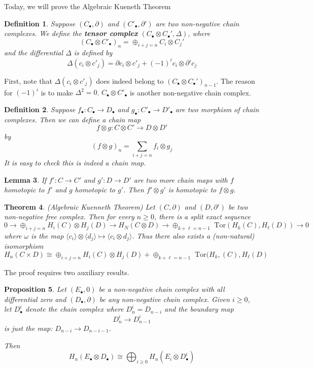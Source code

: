 \documentclass[11pt]{article}
\newtheorem{thm}{Theorem}[section]
\newtheorem{prop}[thm]{Proposition}
\newtheorem{lemma}[thm]{Lemma}
\newtheorem{dfn}[thm]{Definition}
\newcommand{\tor}{\text{ Tor}}
\newcommand{\pd}{\partial}
\newcommand{\lrta}{\longrightarrow}
\newcommand{\lgl}{\langle}
\newcommand{\rgl}{\rangle}
\begin{document}
Today, we will prove the Algebraic Kueneth Theorem
\begin{dfn}
Suppose $(C_\bullet,\pd)$ and $(C'_\bullet,\pd')$ are two non-negative chain complexes. We define the  \textbf{tensor complex} $(C_\bullet\otimes C_\bullet',\Delta)$, where
$$
(C_\bullet\otimes C'_\bullet)_n=\oplus_{i+j=n}C_i\otimes C_j'
$$
and the differential $\Delta$ is defined by 
$$
\Delta(c_i\otimes c'_j)=\pd c_i\otimes c'_j+(-1)^{i}c_i\otimes \pd' c_j
$$
\end{dfn}
First, note that $\Delta(c_i\otimes c'_j)$ does indeed belong to $(C_\bullet\otimes C_\bullet')_{n-1}$. The reason for $(-1)^i$ is to make $\Delta^2=0$.
$C_\bullet\otimes C'_\bullet$ is another  non-negative chain complex.
\begin{dfn}
Suppose $f_\bullet:C_\bullet\lrta D_\bullet$ and $g_\bullet: C'_\bullet\lrta D'_\bullet$ are two morphism of chain complexes. Then we can define a chain map
$$
f\otimes g: C\otimes C'\lrta D\otimes D'
$$
by 
$$
(f\otimes g)_n=\sum_{i+j=n}f_i\otimes g_j
$$
It is easy to check this is indeed a chain map.
\end{dfn}
\begin{lemma}
If $f':C\lrta C'$  and $g':D\lrta D'$ are two more chain maps with $f$ homotopic to $f'$ and $g$ homotopic to $g'$. Then $f'\otimes g'$ is homotopic to $f\otimes g$.
\end{lemma}
\begin{thm}
(Algebraic Kuenneth Theorem) Let $(C,\pd)$ and $(D,\pd')$ be two non-negative free complex. Then for every $n\geq 0$, there is a split exact sequence
$$
0\lrta \oplus_{i+j=n}H_i(C)\otimes H_j(D)\lrta H_N(C\otimes D)\lrta \oplus_{k+\ell=n-1}\tor(H_k(C),H_\ell(D))\lrta 0
$$
where $\omega$ is the map $\langle c_i\rangle\otimes \lgl d_j\rgl\mapsto \lgl c_i\otimes d_j\rgl$. 
Thus there also exists a (non-natural) isomorphism 
$$
H_n(C\times D)\cong \oplus_{i+j=n}H_i(C)\otimes H_j (D)+\oplus_{k+\ell=n-1} \tor(H_k,(C),H_\ell(D)
$$
\end{thm}
The proof requires two auxiliary results.
\begin{prop}
Let $(E_\bullet,0)$ be a non-negative chain complex with all differential zero and $(D_\bullet,\pd)$ be any non-negative chain complex. Given $i\geq 0$, let $D^i_\bullet$ denote the chain complex where $D^i_n=D_{n-i}$ and the boundary map 
$$
D^i_n\lrta D^i_{n-1}
$$
is just the map: $D_{n-i}\lrta D_{n-i-1}$.

Then
$$
H_n(E_\bullet\otimes D_\bullet)\cong \bigoplus_{i\geq 0} H_n(E_i\otimes D^i_\bullet)
$$
\end{prop}
\end{document}
